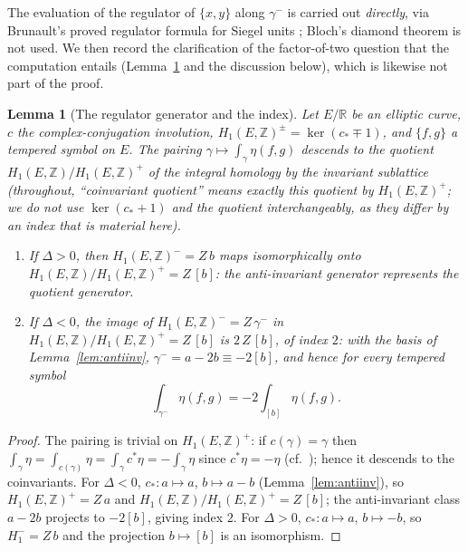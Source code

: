 \documentclass[11pt]{amsart}
\newtheorem{lemma}[theorem]{Lemma}
\theoremstyle{definition}
\theoremstyle{remark}
\newcommand{\Z}{\mathbb{Z}}
\newcommand{\R}{\mathbb{R}}
\begin{document}
The evaluation of the regulator of $\{x,y\}$ along $\gamma^-$ is carried out
\emph{directly}, via Brunault's proved regulator formula for Siegel units
\cite{BrunaultSiegel}; Bloch's diamond theorem is not used.  We then record
the clarification of the factor-of-two question that the computation
entails (Lemma~\ref{lem:coinvariant} and the discussion below), which is
likewise not part of the proof.

\begin{lemma}[The regulator generator and the index]\label{lem:coinvariant}
Let $E/\R$ be an elliptic curve, $c$ the complex-conjugation involution,
$H_1(E,\Z)^\pm=\ker(c_*\mp1)$, and $\{f,g\}$ a tempered symbol on $E$.
The pairing $\gamma\mapsto\int_\gamma\eta(f,g)$ descends to the quotient
$H_1(E,\Z)/H_1(E,\Z)^+$ of the integral homology by the invariant
sublattice (throughout, ``coinvariant quotient'' means exactly this
quotient by $H_1(E,\Z)^+$; we do not use $\ker(c_*+1)$ and the quotient
interchangeably, as they differ by an index that is material here).
\begin{enumerate}
  \item If $\Delta>0$, then $H_1(E,\Z)^-=Z\,b$ maps isomorphically onto
  $H_1(E,\Z)/H_1(E,\Z)^+=Z\,[b]$: the anti-invariant generator represents
  the quotient generator.
  \item If $\Delta<0$, the image of $H_1(E,\Z)^-=Z\,\gamma^-$ in
  $H_1(E,\Z)/H_1(E,\Z)^+=Z\,[b]$ is $2\,Z\,[b]$, of index $2$: with the
  basis of Lemma~\ref{lem:antiinv}, $\gamma^-=a-2b\equiv-2[b]$, and hence
  for every tempered symbol
  \[
    \int_{\gamma^-}\eta(f,g)=-2\int_{[b]}\eta(f,g).
  \]
\end{enumerate}
\end{lemma}

\begin{proof}
The pairing is trivial on $H_1(E,\Z)^+$: if $c(\gamma)=\gamma$ then
$\int_\gamma\eta=\int_{c(\gamma)}\eta=\int_\gamma c^*\eta=-\int_\gamma\eta$
since $c^*\eta=-\eta$ (cf.\ \cite[Rem.~4]{LalinRam}); hence it descends to
the coinvariants.  For $\Delta<0$, $c_*:a\mapsto a$, $b\mapsto a-b$
(Lemma~\ref{lem:antiinv}), so $H_1(E,\Z)^+=Z\,a$ and
$H_1(E,\Z)/H_1(E,\Z)^+=Z\,[b]$; the anti-invariant class $a-2b$ projects
to $-2[b]$, giving index $2$.  For $\Delta>0$, $c_*:a\mapsto a$,
$b\mapsto-b$, so $H_1^-=Z\,b$ and the projection $b\mapsto[b]$ is an
isomorphism.
\end{proof}
\end{document}
